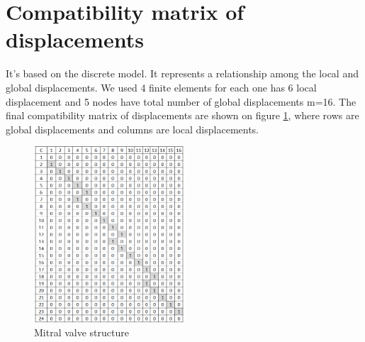 \section*{Compatibility matrix of displacements}
It's based on the discrete model. It represents a relationship among the local
and global displacements. We used 4 finite elements for each one has 6 local
displacement and 5 nodes have total number of global displacements m=16. The
final compatibility matrix of displacements are shown on figure
\ref{fig:CDmatrix}, where rows are global displacements and columns are local
displacements.
\begin{figure}[H]
  \centering
  \includegraphics[width=0.5\textwidth]{./fig/CDmatrix.png}
    \caption{Mitral valve structure}
    \label{fig:CDmatrix}
\end{figure}
\begin{multicols}{2}
\end{multicols}